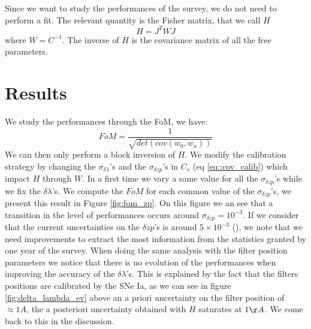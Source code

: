 \documentclass[\docopts]{\docclass}
\begin{document}
Since we want to study the performances of the survey, we do not need to perform a fit.
The relevant quantity is the Fisher matrix, that we call $H$
\begin{equation}
H = J^TWJ
\end{equation}
where $W = C^{-1}$.
The inverse of $H$ is the covariance matrix of all the free parameters.


\section{Results}
\label{sec::results}
We study the performances through the FoM, we have:
\begin{equation}
FoM = \frac{1}{\sqrt{det(cov(w_0, w_a))}}
\end{equation}
We can then only perform a block inversion of $H$.
We modify the calibration strategy by changing the $\sigma_{\delta \lambda}$'s and the $\sigma_{\delta zp}$'s in $C_s$ (eq \ref{eq::cov_calib}) which impact $H$ through $W$.
In a first time we vary a same value for all the $\sigma_{\delta zp}$'s while we fix the $\delta \lambda$'s.
We compute the $FoM$ for each common value of the $\sigma_{\delta zp}$'s, we present this result in Figure \ref{fig:fom_zp}.
On this figure we an see that a transition in the level of performances occurs around $\sigma_{\delta zp} = 10^{-3}$.
If we consider that the current uncertainties on the $\delta zp$'s is around $5 \times 10^{-3}$ (\cite{1401.4064}), we note that we need improvements to extract the most information from the statistics granted by one year of the survey.
When doing the same analysis with the filter position parameters we notice that there is no evolution of the performances when improving the accuracy of the $\delta\lambda$'s. This is explained by the fact that the filters positions are calibrated by the SNe Ia, as we can see in figure \ref{fig:delta_lambda_ev} above an a priori uncertainty on the filter position of $\approx 1A$, the a posteriori uncertainty obtained with $H$ saturates at $1 \AA$. We come back to this in the discussion.
\end{document}
